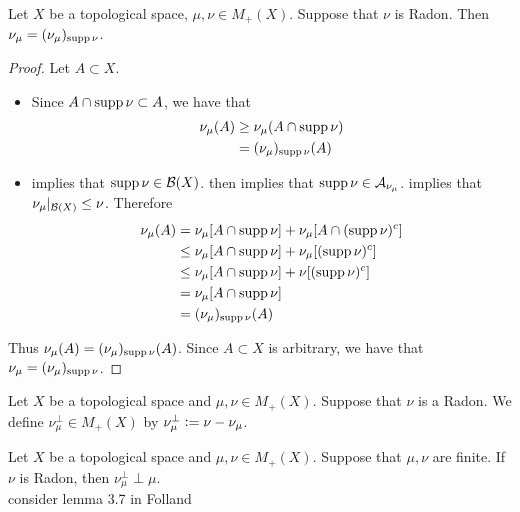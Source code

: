 \documentclass{book}
\begin{document}
	\begin{ex} 
		Let $X$ be a topological space, $\mu, \nu \in M_+(X)$. Suppose that $\nu$ is Radon. Then $\nu_{\mu} = (\nu_{\mu})_{\operatorname{supp} \nu}$. 
	\end{ex}

	\begin{proof}
		Let $A \subset X$. 
		\begin{itemize}
			\item Since $A \cap \operatorname{supp} \nu \subset A$, we have that
			\begin{align*}
				\nu_{\mu}(A) 
				& \geq \nu_{\mu}(A \cap \operatorname{supp} \nu) \\
				& = (\nu_{\mu})_{\operatorname{supp} \nu}(A) 
			\end{align*}
			\item {} implies that $\operatorname{supp} \nu \in \mathcal{B}(X)$.  then implies that $\operatorname{supp} \nu \in \mathcal{A}_{\nu_{\mu}}$.  implies that $\nu_{\mu}|_{\mathcal{B}(X)} \leq \nu$. Therefore
			\begin{align*}
				\nu_{\mu}(A)
				& = \nu_{\mu}[A \cap \operatorname{supp} \nu] + \nu_{\mu}[A \cap (\operatorname{supp} \nu)^c] \\
				& \leq \nu_{\mu}[A \cap \operatorname{supp} \nu] + \nu_{\mu}[(\operatorname{supp} \nu)^c] \\ 
				& \leq \nu_{\mu}[A \cap \operatorname{supp} \nu] + \nu[(\operatorname{supp} \nu)^c] \\ 
				& = \nu_{\mu}[A \cap \operatorname{supp} \nu] \\
				& = (\nu_{\mu})_{\operatorname{supp} \nu}(A)
			\end{align*}
		\end{itemize}
		Thus $\nu_{\mu}(A) = (\nu_{\mu})_{\operatorname{supp} \nu}(A)$. Since $A \subset X$ is arbitrary, we have that $\nu_{\mu} = (\nu_{\mu})_{\operatorname{supp} \nu}$.
	\end{proof}
	
	\begin{defn} 
		Let $X$ be a topological space and $\mu, \nu \in M_+(X)$. Suppose that $\nu$ is a Radon. We define $\nu_{\mu}^{\perp} \in M_+(X)$ by $\nu_{\mu}^{\perp} \vcentcolon= \nu - \nu_{\mu}$.
	\end{defn}
	
	\begin{ex} 
		Let $X$ be a topological space and $\mu, \nu \in M_+(X)$. Suppose that $\mu,\nu$ are finite. If $\nu$ is Radon, then $\nu_{\mu}^{\perp} \perp \mu$. \\
		 consider lemma 3.7 in Folland
	\end{ex}
	
\end{document}

